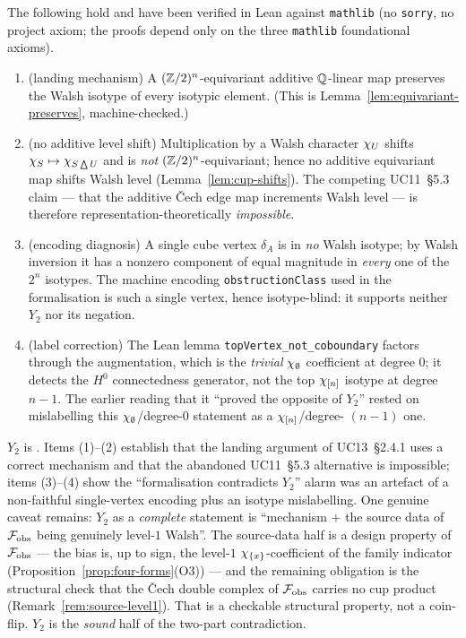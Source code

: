 \begin{theorem}
\label{thm:y2-mechanism}
The following hold and have been verified in Lean against
\texttt{mathlib} \textup(no \texttt{sorry}, no project axiom; the proofs
depend only on the three \texttt{mathlib} foundational axioms\textup).
\begin{enumerate}[label=\textup{(\arabic*)},leftmargin=2.4em]
\item \textup{(landing mechanism)} A $(\mathbb{Z}/2)^n$-equivariant additive
  $\mathbb{Q}$-linear map preserves the Walsh isotype of every isotypic
  element. \textup(This is
  Lemma~\ref{lem:equivariant-preserves}, machine-checked.\textup)
\item \textup{(no additive level shift)} Multiplication by a Walsh
  character $\chi_{U}$ shifts $\chi_{S}\mapsto\chi_{S\bigtriangleup
  U}$ and is \emph{not} $(\mathbb{Z}/2)^n$-equivariant; hence no additive
  equivariant map shifts Walsh level
  \textup(Lemma~\ref{lem:cup-shifts}\textup). The competing UC11~\S5.3
  claim --- that the additive \v{C}ech edge map increments Walsh level
  --- is therefore representation-theoretically \emph{impossible}.
\item \textup{(encoding diagnosis)} A single cube vertex $\delta_A$ is
  in \emph{no} Walsh isotype; by Walsh inversion it has a nonzero
  component of equal magnitude in \emph{every} one of the $2^n$
  isotypes. The machine encoding \texttt{obstructionClass} used in the
  formalisation is such a single vertex, hence isotype-blind: it
  supports neither $Y_2$ nor its negation.
\item \textup{(label correction)} The Lean lemma
  \texttt{topVertex\_not\_coboundary} factors through the augmentation,
  which is the \emph{trivial} $\chi_{\emptyset}$ coefficient at degree
  $0$; it detects the $H^0$ connectedness generator, not the top
  $\chi_{[n]}$ isotype at degree $n-1$. The earlier reading that it
  ``proved the opposite of $Y_2$'' rested on mislabelling this
  $\chi_{\emptyset}$/degree-$0$ statement as a $\chi_{[n]}$/degree-%
  $(n-1)$ one.
\end{enumerate}
\end{theorem}

\begin{status}
$Y_2$ is . Items (1)--(2) establish that the
landing argument of UC13~\S2.4.1 uses a correct mechanism and that the
abandoned UC11~\S5.3 alternative is impossible; items (3)--(4) show the
``formalisation contradicts $Y_2$'' alarm was an artefact of a
non-faithful single-vertex encoding plus an isotype mislabelling. One
genuine caveat remains: $Y_2$ as a \emph{complete} statement is
``mechanism $+$ the source data of $\mathcal{F}_{\mathrm{obs}}$ being genuinely level-$1$
Walsh''. The source-data half is a design property of $\mathcal{F}_{\mathrm{obs}}$ --- the
bias is, up to sign, the level-$1$ $\chi_{\{x\}}$-coefficient of the
family indicator (Proposition~\ref{prop:four-forms}(O3)) --- and the
remaining obligation is the structural check that the \v{C}ech double
complex of $\mathcal{F}_{\mathrm{obs}}$ carries no cup product
(Remark~\ref{rem:source-level1}). That is a checkable structural
property, not a coin-flip. $Y_2$ is the \emph{sound} half of the
two-part contradiction.
\end{status}

